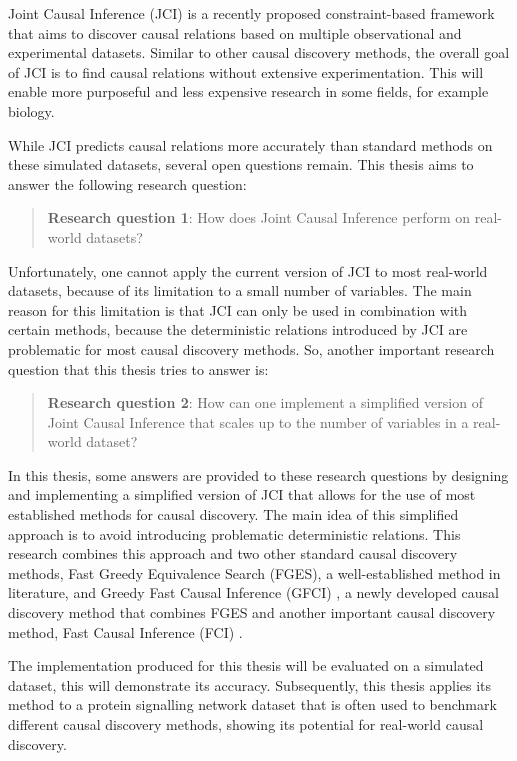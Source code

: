 \documentclass[a4paper,pdf]{article}
\begin{document}
Joint Causal Inference (JCI) \cite{jci} is a recently proposed constraint-based framework that aims to discover causal relations based on multiple observational and experimental datasets. Similar to other causal discovery methods, the overall goal of JCI is to find causal relations without extensive experimentation. This will enable more purposeful and less expensive research in some fields, for example biology.

While JCI predicts causal relations more accurately than standard methods on these simulated datasets, several open questions remain. This thesis aims to answer the following research question:
\begin{quote}
\textbf{Research question 1}: How does Joint Causal Inference perform on real-world datasets?
\end{quote}
Unfortunately, one cannot apply the current version of JCI to most real-world datasets, because of its limitation to a small number of variables. The main reason for this limitation is that JCI can only be used in combination with certain methods, because the deterministic relations introduced by JCI are problematic for most causal discovery methods. So, another important research question that this thesis tries to answer is:
\begin{quote}
\textbf{Research question 2}: How can one implement a simplified version of Joint Causal Inference that scales up to the number of variables in a real-world dataset?
\end{quote}
In this thesis, some answers are provided to these research questions by designing and implementing a simplified version of JCI that allows for the use of most established methods for causal discovery. 
The main idea of this simplified approach is to avoid introducing problematic deterministic relations.
This research combines this approach and two other standard causal discovery methods, Fast Greedy Equivalence Search (FGES), a well-established method in literature, and Greedy Fast Causal Inference (GFCI) \cite{gfci}, a newly developed causal discovery method that combines FGES and another important causal discovery method, Fast Causal Inference (FCI) \cite{Spirtes2000}.

The implementation produced for this thesis will be evaluated on a simulated dataset, this will demonstrate its accuracy. Subsequently, this thesis applies its method to a protein signalling network dataset \cite{sachs2005causal} that is often used to benchmark different causal discovery methods, showing its potential for real-world causal discovery.
\end{document}
